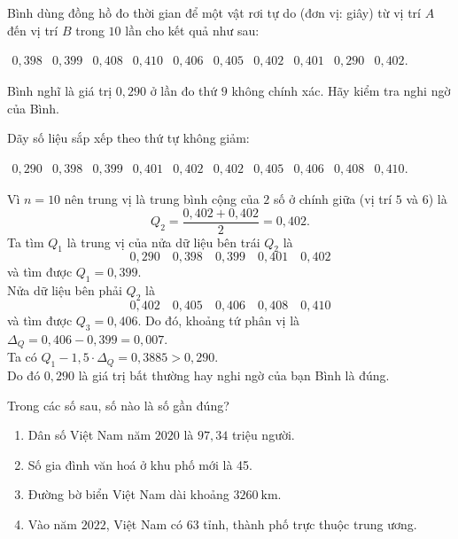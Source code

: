 \begin{bt}%
	Bình dùng đồng hồ đo thời gian để một vật rơi tự do (đơn vị: giây) từ vị trí $A$ đến vị trí $B$ trong $10$ lần cho kết quả như sau:
	\begin{center}
	$\begin{array}{llllllllll}0{,}398 & 0{,}399 & 0{,}408 & 0{,}410 & 0{,}406 & 0{,}405 & 0{,}402 & 0{,}401 & 0{,}290 & 0{,}402 .\end{array}$
	\end{center}
	Bình nghĩ là giá trị $0{,}290$ ở lần đo thứ $9$ không chính xác. Hãy kiểm tra nghi ngờ của Bình.
	\loigiai
	{
	Dãy số liệu sắp xếp theo thứ tự không giảm:
	\begin{center}
		$\begin{array}{llllllllllll}0{,}290 & 0{,}398 & 0{,}399 & 0{,}401 & 0{,}402 & 0{,}402 & 0{,}405 & 0{,}406 & 0{,}408 & 0{,}410 .\end{array}$
	\end{center}
	Vì $n=10$ nên trung vị là trung bình cộng của $2$ số ở chính giữa (vị trí $5$ và $6$) là $$Q_2=\dfrac{0{,}402+0{,}402}{2}=0{,}402.$$
	Ta tìm $Q_{1}$ là trung vị của nửa dữ liệu bên trái $Q_{2}$ là 
	$$0{,}290 \quad 0{,}398 \quad 0{,}399 \quad 0{,}401 \quad 0{,}402$$
	và tìm được $Q_{1}=0{,}399$.\\
	Nửa dữ liệu bên phải $Q_{2}$ là $$0{,}402 \quad 0{,}405 \quad 0{,}406 \quad 0{,}408 \quad 0{,}410$$
	và tìm được $Q_{3}=0{,}406 $.
	Do đó, khoảng tứ phân vị là $\Delta_{Q}=0{,}406 -0{,}399 =0{,}007$.\\
	Ta có $Q_{1}-1{,}5 \cdot \Delta_{Q}=0{,}3885>0{,}290$.\\
	Do đó $0{,}290$ là giá trị bất thường hay nghi ngờ của bạn Bình là đúng.
	}
\end{bt}

\begin{bt}%
	Trong các số sau, số nào là số gần đúng?
	\begin{enumerate}
		\item Dân số Việt Nam năm $2020$ là $97{,}34$ triệu người.
		\item Số gia đình văn hoá ở khu phố mới là 45.
		\item Đường bờ biển Việt Nam dài khoảng $3260 \mathrm{~km}$.
		\item Vào năm $2022$, Việt Nam có $63$ tỉnh, thành phố trực thuộc trung ương.
	\end{enumerate}
\end{bt}

